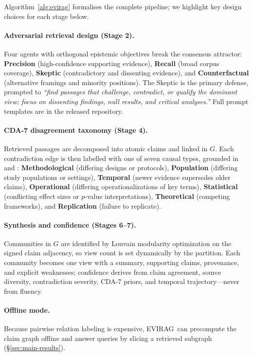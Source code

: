 \documentclass[11pt]{article}
\newcommand{\system}{\textsc{EVIRAG}\xspace}
\begin{document}
Algorithm~\ref{alg:evirag} formalises the complete pipeline; we highlight key
design choices for each stage below.


\paragraph{Adversarial retrieval design (Stage 2).}
Four agents with orthogonal epistemic objectives break the consensus attractor:
\textbf{Precision} (high-confidence supporting evidence), \textbf{Recall}
(broad corpus coverage), \textbf{Skeptic} (contradictory and dissenting
evidence), and \textbf{Counterfactual} (alternative framings and minority
positions).  The Skeptic is the primary defense, prompted to \textit{``find
passages that challenge, contradict, or qualify the dominant view; focus on
dissenting findings, null results, and critical analyses.''}  Full prompt
templates are in the released repository.

\paragraph{CDA-7 disagreement taxonomy (Stage 4).}
\label{sec:cda7}
Retrieved passages are decomposed into atomic claims and linked in $G$.
Each contradiction edge is then labelled with one of seven causal types,
grounded in \citet{longino2002science} and \citet{solomon2001social}:
\textbf{Methodological} (differing designs or protocols), \textbf{Population}
(differing study populations or settings), \textbf{Temporal} (newer evidence
supersedes older claims), \textbf{Operational} (differing operationalizations
of key terms), \textbf{Statistical} (conflicting effect sizes or $p$-value
interpretations), \textbf{Theoretical} (competing frameworks), and
\textbf{Replication} (failure to replicate).

\paragraph{Synthesis and confidence (Stages 6--7).}
Communities in $G$ are identified by Louvain modularity optimization on the
signed claim adjacency, so view count is set dynamically by the partition.
Each community becomes one view with a summary, supporting claims, provenance,
and explicit weaknesses; confidence derives from claim agreement, source
diversity, contradiction severity, CDA-7 priors, and temporal
trajectory---never from fluency.

\paragraph{Offline mode.}
Because pairwise relation labeling is expensive, \system\ can precompute the
claim graph offline and answer queries by slicing a retrieved subgraph
(\S\ref{sec:main-results}).
\end{document}
